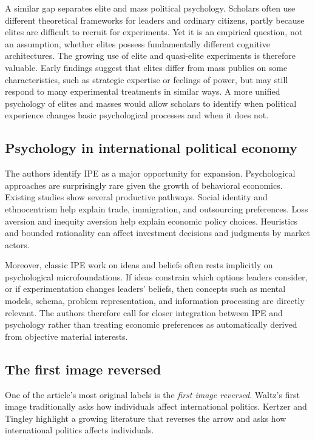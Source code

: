 A similar gap separates elite and mass political psychology. Scholars often use different theoretical frameworks for leaders and ordinary citizens, partly because elites are difficult to recruit for experiments. Yet it is an empirical question, not an assumption, whether elites possess fundamentally different cognitive architectures. The growing use of elite and quasi-elite experiments is therefore valuable. Early findings suggest that elites differ from mass publics on some characteristics, such as strategic expertise or feelings of power, but may still respond to many experimental treatments in similar ways. A more unified psychology of elites and masses would allow scholars to identify when political experience changes basic psychological processes and when it does not.

\subsection{Psychology in international political economy}

The authors identify IPE as a major opportunity for expansion. Psychological approaches are surprisingly rare given the growth of behavioral economics. Existing studies show several productive pathways. Social identity and ethnocentrism help explain trade, immigration, and outsourcing preferences. Loss aversion and inequity aversion help explain economic policy choices. Heuristics and bounded rationality can affect investment decisions and judgments by market actors.

Moreover, classic IPE work on ideas and beliefs often rests implicitly on psychological microfoundations. If ideas constrain which options leaders consider, or if experimentation changes leaders' beliefs, then concepts such as mental models, schema, problem representation, and information processing are directly relevant. The authors therefore call for closer integration between IPE and psychology rather than treating economic preferences as automatically derived from objective material interests.

\subsection{The first image reversed}

One of the article's most original labels is the \emph{first image reversed}. Waltz's first image traditionally asks how individuals affect international politics. Kertzer and Tingley highlight a growing literature that reverses the arrow and asks how international politics affects individuals.


